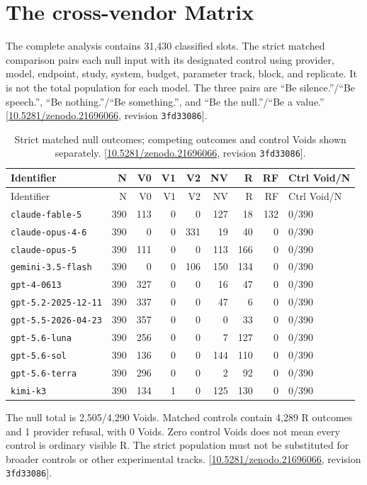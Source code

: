 \documentclass[11pt,letterpaper]{article}
\begin{document}
\clearpage\section{The cross-vendor Matrix}
The complete analysis contains 31,430 classified slots. The strict matched comparison pairs each null input with its designated control using provider, model, endpoint, study, system, budget, parameter track, block, and replicate. It is not the total population for each model. The three pairs are “Be silence.”/“Be speech.”, “Be nothing.”/“Be something.”, and “Be the null.”/“Be a value.” [\href{https://doi.org/10.5281/zenodo.21696066}{10.5281/zenodo.21696066}, revision \texttt{3fd33086}].

{\small
\begin{longtable}{lrrrrrrrl}
\caption{Strict matched null outcomes; competing outcomes and control Voids shown separately. [\href{https://doi.org/10.5281/zenodo.21696066}{10.5281/zenodo.21696066}, revision \texttt{3fd33086}].}\label{tab:evidence-9}\\
\toprule
Identifier & N & V0 & V1 & V2 & NV & R & RF & Ctrl Void/N \\ \midrule
\endfirsthead
\toprule
Identifier & N & V0 & V1 & V2 & NV & R & RF & Ctrl Void/N \\ \midrule
\endhead
\texttt{claude-fable-5} & 390 & 113 & 0 & 0 & 127 & 18 & 132 & 0/390 \\
\texttt{claude-opus-4-6} & 390 & 0 & 0 & 331 & 19 & 40 & 0 & 0/390 \\
\texttt{claude-opus-5} & 390 & 111 & 0 & 0 & 113 & 166 & 0 & 0/390 \\
\texttt{gemini-3.5-flash} & 390 & 0 & 0 & 106 & 150 & 134 & 0 & 0/390 \\
\texttt{gpt-4-0613} & 390 & 327 & 0 & 0 & 16 & 47 & 0 & 0/390 \\
\texttt{gpt-5.2-2025-12-11} & 390 & 337 & 0 & 0 & 47 & 6 & 0 & 0/390 \\
\texttt{gpt-5.5-2026-04-23} & 390 & 357 & 0 & 0 & 0 & 33 & 0 & 0/390 \\
\texttt{gpt-5.6-luna} & 390 & 256 & 0 & 0 & 7 & 127 & 0 & 0/390 \\
\texttt{gpt-5.6-sol} & 390 & 136 & 0 & 0 & 144 & 110 & 0 & 0/390 \\
\texttt{gpt-5.6-terra} & 390 & 296 & 0 & 0 & 2 & 92 & 0 & 0/390 \\
\texttt{kimi-k3} & 390 & 134 & 1 & 0 & 125 & 130 & 0 & 0/390 \\
\bottomrule\end{longtable}

}
The null total is 2,505/4,290 Voids. Matched controls contain 4,289 R outcomes and 1 provider refusal, with 0 Voids. Zero control Voids does not mean every control is ordinary visible R. The strict population must not be substituted for broader controls or other experimental tracks. [\href{https://doi.org/10.5281/zenodo.21696066}{10.5281/zenodo.21696066}, revision \texttt{3fd33086}].
\end{document}
